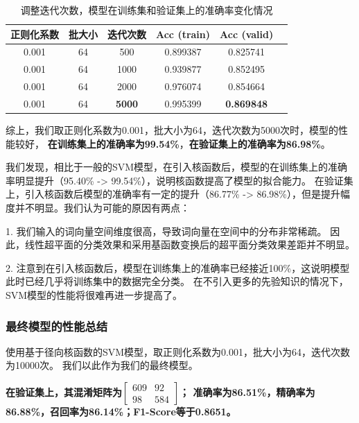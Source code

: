 \documentclass[12pt, a4paper]{article}
\begin{document}
        \begin{table}[htbp]
        \caption{调整迭代次数，模型在训练集和验证集上的准确率变化情况}
        \centering
        \begin{tabular}{cccccc}
            \toprule
            正则化系数 & 批大小 & 迭代次数        & Acc (train) & Acc (valid)       \\
            \midrule
            0.001     &  64    &  500           &  0.899387   &  0.825741          \\
            0.001     &  64    &  1000          &  0.939877   &  0.852495          \\
            0.001     &  64    &  2000          &  0.976074   &  0.854664          \\
            0.001     &  64    &  \textbf{5000} &  0.995399   &  \textbf{0.869848}
        \end{tabular}
        \end{table}

        综上，我们取正则化系数为0.001，批大小为64，迭代次数为5000次时，模型的性能较好，
        \textbf{在训练集上的准确率为99.54\%}，\textbf{在验证集上的准确率为86.98\%}。

        我们发现，相比于一般的SVM模型，在引入核函数后，模型的在训练集上的准确率明显提升（95.40\% -> 99.54\%），说明核函数提高了模型的拟合能力。
        在验证集上，引入核函数后模型的准确率有一定的提升（86.77\% -> 86.98\%），但是提升幅度并不明显。我们认为可能的原因有两点：

        1. 我们输入的词向量空间维度很高，导致词向量在空间中的分布非常稀疏。
        因此，线性超平面的分类效果和采用基函数变换后的超平面分类效果差距并不明显。

        2. 注意到在引入核函数后，模型在训练集上的准确率已经接近100\%，这说明模型此时已经几乎将训练集中的数据完全分类。
        在不引入更多的先验知识的情况下，SVM模型的性能将很难再进一步提高了。

    \subsubsection{最终模型的性能总结}

        使用基于径向核函数的SVM模型，取正则化系数为0.001，批大小为64，迭代次数为10000次。
        我们以此作为我们的最终模型。

        \textbf{在验证集上，其混淆矩阵为$\begin{bmatrix} 609 & 92 \\ 98 & 584 \end{bmatrix}$；
        准确率为86.51\%，精确率为86.88\%，召回率为86.14\%；F1-Score等于0.8651。}
\end{document}
